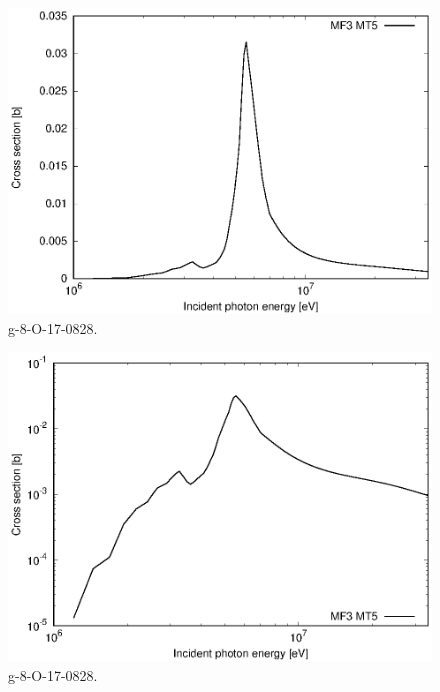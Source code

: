 \begin{figure}
 \includegraphics[width=\linewidth]{eps/g_8-O-17_0828.eps}
  \caption{g-8-O-17-0828.}
\end{figure}
\begin{figure}
 \includegraphics[width=\linewidth]{eps-log/g_8-O-17_0828.eps}
 \caption{g-8-O-17-0828.}
\end{figure}
\newpage \clearpage

